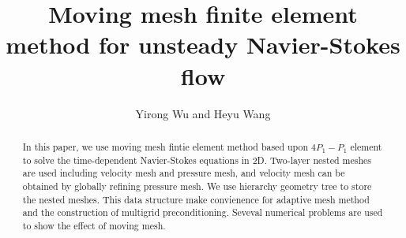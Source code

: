 \documentclass[mathpazo]{aamm}
\begin{document}

\title{Moving mesh finite element method for unsteady Navier-Stokes flow}


%
%
%
\author[Yirong Wu and Heyu Wang]{Yirong Wu and Heyu Wang\corrauth}
\address{School of Mathematical Science, ZheJiang University, HangZhou,
  310027, China}


\begin{abstract}
    In this paper, we use moving mesh fintie element method based upon
    $4P_1-P_1$ element to solve the time-dependent Navier-Stokes
    equations in 2D. Two-layer nested meshes are used including
    velocity mesh and pressure mesh, and velocity mesh can be obtained
    by globally refining pressure mesh. We use hierarchy
    geometry tree to store the nested meshes. This data
    structure make convienence for adaptive mesh method and the
    construction of multigrid preconditioning. 
    Seveval numerical problems are used to show the effect of moving mesh. \\
\end{abstract}


\maketitle
\end{document}
